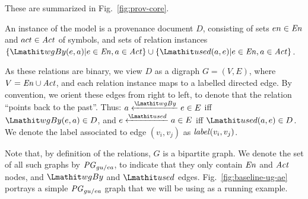 These are summarized in Fig.~\ref{fig:prov-core}.
%


%
An instance  of the model is a provenance document $D$, consisting of sets $en \in \mathit{En}$ and $act \in \mathit{Act}$ of symbols, and sets of relation instances $\{ \wgby(e,a)  | e \in \en, a \in \act \} \cup   \{ \used(a,e)  | e \in \en, a \in \act\}$. 

%
As these relations are binary, we view $D$ as a digraph $G=(V,E)$, where $V= \mathit{En} \cup \mathit{Act}$, and each relation instance maps to a labelled directed edge. By convention, we orient these edges from right to left, to denote that the relation ``points back to the past''. Thus:
$a \xleftarrow{\wgby} e \in E$ iff $\wgby(e,a) \in D$, and $e \xleftarrow{\used} a \in E$ iff $\used(a,e) \in D$.
%
We denote the label associated to edge $(v_i, v_j)$ as $\mathit{label}(v_i,v_j)$. 

%
Note that, by definition of the relations, $G$ is a bipartite graph.
We denote the set of all such graphs by $\mathit{PG}_{gu/ea}$, to indicate that they only contain $\mathit{En}$ and $\mathit{Act}$ nodes, and $\wgby$ and $\used$ edges.
Fig.~\ref{fig:baseline-ug-ae} portrays a simple $\mathit{PG}_{gu/ea}$ graph that we will be using as a running example. %


